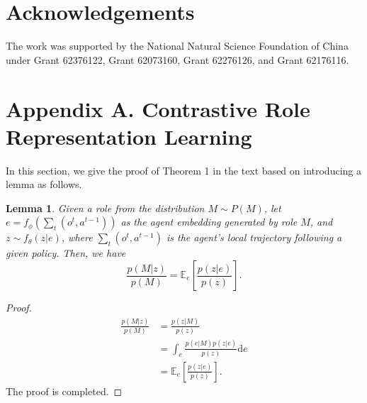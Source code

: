 \documentclass{article} %
\newtheorem{lemma}{Lemma}
\begin{document}
\section*{Acknowledgements}
The work was supported by the National Natural Science Foundation of China under Grant 62376122, Grant 62073160, Grant 62276126, and Grant 62176116.









\clearpage
\appendix



\section*{Appendix A. Contrastive Role Representation Learning}
In this section, we give the proof of Theorem 1 in the text based on introducing a lemma as follows.


\begin{lemma}
    Given a role from the distribution $M\sim P(M)$, let $e=f_{\phi}(\sum_t (o^t,a^{t-1}))$ as the agent embedding generated by role $M$, and $z\sim f_{\theta}(z|e)$, where $\sum_t(o^t,a^{t-1})$ is the agent's local trajectory following a given policy. Then, we have
    \begin{equation}
        \frac{p(M|z)}{p(M)} = \mathbb{E}_{e}\left[ \frac{p(z|e)}{p(z)}\right].
    \end{equation}
\end{lemma}

\begin{proof}
\begin{equation}
\begin{aligned}
\frac{p(M|z)}{p(M)} 
& = \frac{p(z|M)}{p(z)} \\
& = \int_{e}\frac{p(e|M)p(z|e)}{p(z)}\mathrm{d}e \\
& = \mathbb{E}_{e}\left[ \frac{p(z|e)}{p(z)} \right].
\end{aligned}
\end{equation}
The proof is completed.
\end{proof}
\end{document}
